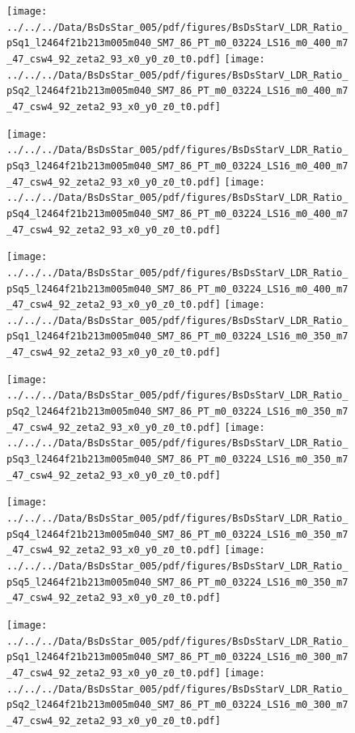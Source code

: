 \documentclass[a4paper,10pt]{article}
\begin{document}
\begin{figure}[p]
 \texttt{[image: ../../../Data/BsDsStar\_005/pdf/figures/BsDsStarV\_LDR\_Ratio\_pSq1\_l2464f21b213m005m040\_SM7\_86\_PT\_m0\_03224\_LS16\_m0\_400\_m7\_47\_csw4\_92\_zeta2\_93\_x0\_y0\_z0\_t0.pdf]} 
 \texttt{[image: ../../../Data/BsDsStar\_005/pdf/figures/BsDsStarV\_LDR\_Ratio\_pSq2\_l2464f21b213m005m040\_SM7\_86\_PT\_m0\_03224\_LS16\_m0\_400\_m7\_47\_csw4\_92\_zeta2\_93\_x0\_y0\_z0\_t0.pdf]} 
 \end{figure}
\begin{figure}[p]
 \texttt{[image: ../../../Data/BsDsStar\_005/pdf/figures/BsDsStarV\_LDR\_Ratio\_pSq3\_l2464f21b213m005m040\_SM7\_86\_PT\_m0\_03224\_LS16\_m0\_400\_m7\_47\_csw4\_92\_zeta2\_93\_x0\_y0\_z0\_t0.pdf]} 
 \texttt{[image: ../../../Data/BsDsStar\_005/pdf/figures/BsDsStarV\_LDR\_Ratio\_pSq4\_l2464f21b213m005m040\_SM7\_86\_PT\_m0\_03224\_LS16\_m0\_400\_m7\_47\_csw4\_92\_zeta2\_93\_x0\_y0\_z0\_t0.pdf]} 
 \end{figure}
\begin{figure}[p]
 \texttt{[image: ../../../Data/BsDsStar\_005/pdf/figures/BsDsStarV\_LDR\_Ratio\_pSq5\_l2464f21b213m005m040\_SM7\_86\_PT\_m0\_03224\_LS16\_m0\_400\_m7\_47\_csw4\_92\_zeta2\_93\_x0\_y0\_z0\_t0.pdf]} 
 \texttt{[image: ../../../Data/BsDsStar\_005/pdf/figures/BsDsStarV\_LDR\_Ratio\_pSq1\_l2464f21b213m005m040\_SM7\_86\_PT\_m0\_03224\_LS16\_m0\_350\_m7\_47\_csw4\_92\_zeta2\_93\_x0\_y0\_z0\_t0.pdf]} 
 \end{figure}
\clearpage
\begin{figure}[p]
 \texttt{[image: ../../../Data/BsDsStar\_005/pdf/figures/BsDsStarV\_LDR\_Ratio\_pSq2\_l2464f21b213m005m040\_SM7\_86\_PT\_m0\_03224\_LS16\_m0\_350\_m7\_47\_csw4\_92\_zeta2\_93\_x0\_y0\_z0\_t0.pdf]} 
 \texttt{[image: ../../../Data/BsDsStar\_005/pdf/figures/BsDsStarV\_LDR\_Ratio\_pSq3\_l2464f21b213m005m040\_SM7\_86\_PT\_m0\_03224\_LS16\_m0\_350\_m7\_47\_csw4\_92\_zeta2\_93\_x0\_y0\_z0\_t0.pdf]} 
 \end{figure}
\begin{figure}[p]
 \texttt{[image: ../../../Data/BsDsStar\_005/pdf/figures/BsDsStarV\_LDR\_Ratio\_pSq4\_l2464f21b213m005m040\_SM7\_86\_PT\_m0\_03224\_LS16\_m0\_350\_m7\_47\_csw4\_92\_zeta2\_93\_x0\_y0\_z0\_t0.pdf]} 
 \texttt{[image: ../../../Data/BsDsStar\_005/pdf/figures/BsDsStarV\_LDR\_Ratio\_pSq5\_l2464f21b213m005m040\_SM7\_86\_PT\_m0\_03224\_LS16\_m0\_350\_m7\_47\_csw4\_92\_zeta2\_93\_x0\_y0\_z0\_t0.pdf]} 
 \end{figure}
\begin{figure}[p]
 \texttt{[image: ../../../Data/BsDsStar\_005/pdf/figures/BsDsStarV\_LDR\_Ratio\_pSq1\_l2464f21b213m005m040\_SM7\_86\_PT\_m0\_03224\_LS16\_m0\_300\_m7\_47\_csw4\_92\_zeta2\_93\_x0\_y0\_z0\_t0.pdf]} 
 \texttt{[image: ../../../Data/BsDsStar\_005/pdf/figures/BsDsStarV\_LDR\_Ratio\_pSq2\_l2464f21b213m005m040\_SM7\_86\_PT\_m0\_03224\_LS16\_m0\_300\_m7\_47\_csw4\_92\_zeta2\_93\_x0\_y0\_z0\_t0.pdf]} 
 \end{figure}
\end{document}
